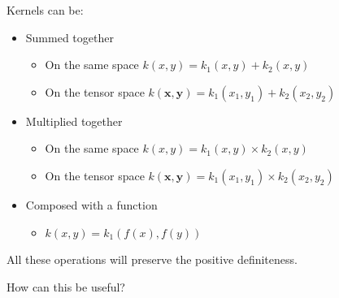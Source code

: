 \documentclass{beamer}
\begin{document}


\begin{frame}{}
\begin{block}{}
Kernels can be:
\begin{itemize}
  \item Summed together
  \begin{itemize}
    \item On the same space $k(x,y) = k_1(x,y) + k_2(x,y)$
    \item On the tensor space $k(\mathbf{x},\mathbf{y}) = k_1(x_1,y_1) + k_2(x_2,y_2)$
  \end{itemize} 
  \item Multiplied together
  \begin{itemize}
    \item On the same space $k(x,y) = k_1(x,y) \times k_2(x,y)$
    \item On the tensor space $k(\mathbf{x},\mathbf{y}) = k_1(x_1,y_1) \times k_2(x_2,y_2)$
  \end{itemize} 
  \item Composed with a function
  \begin{itemize}
    \item $k(x,y) = k_1(f(x),f(y))$
  \end{itemize} 
\end{itemize} 
\end{block}
All these operations will preserve the positive definiteness.\\ 
\vspace{0.2cm}
\begin{center}
\alert{How can this be useful?}
\end{center}
\end{frame}
\end{document}
